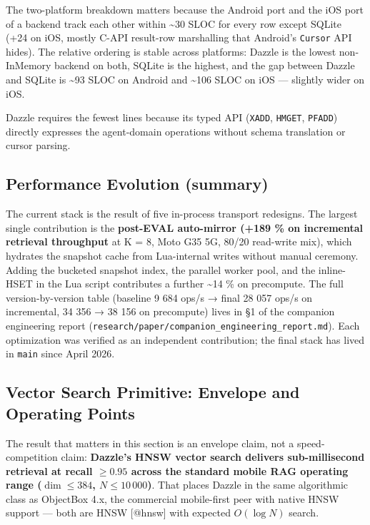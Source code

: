 The two-platform breakdown matters because the Android port and the iOS port of
a backend track each other within \textasciitilde30 SLOC for every row except
SQLite (+24 on iOS, mostly C-API result-row marshalling that Android's
\texttt{Cursor} API hides). The relative ordering is stable across platforms:
Dazzle is the lowest non-InMemory backend on both, SQLite is the highest, and
the gap between Dazzle and SQLite is \textasciitilde93 SLOC on Android and
\textasciitilde106 SLOC on iOS --- slightly wider on iOS.

Dazzle requires the fewest lines because its typed API (\texttt{XADD},
\texttt{HMGET}, \texttt{PFADD}) directly expresses the agent-domain operations
without schema translation or cursor parsing.

\subsection{Performance Evolution
(summary)}\label{performance-evolution-summary}

The current stack is the result of five in-process transport redesigns. The
largest single contribution is the \textbf{post-EVAL auto-mirror (+189 \% on
incremental retrieval throughput} at K = 8, Moto G35 5G, 80/20 read-write mix),
which hydrates the snapshot cache from Lua-internal writes without manual
ceremony. Adding the bucketed snapshot index, the parallel worker pool, and the
inline-HSET in the Lua script contributes a further \textasciitilde14 \% on
precompute. The full version-by-version table (baseline 9 684 ops/s → final 28
057 ops/s on incremental, 34 356 → 38 156 on precompute) lives in §1 of the
companion engineering report
(\texttt{research/paper/companion\_engineering\_report.md}). Each optimization
was verified as an independent contribution; the final stack has lived in
\texttt{main} since April 2026.

\subsection{Vector Search Primitive: Envelope and Operating
Points}\label{vector-search-primitive-envelope-and-operating-points}

The result that matters in this section is an envelope claim, not a
speed-competition claim: \textbf{Dazzle's HNSW vector search delivers
sub-millisecond retrieval at recall \(\geq 0.95\) across the standard mobile RAG
operating range (\(\dim \leq 384\), \(N \leq 10\,000\))}. That places Dazzle in
the same algorithmic class as ObjectBox 4.x, the commercial mobile-first peer
with native HNSW support --- both are HNSW {[}@hnsw{]} with expected
\(O(\log N)\) search.

